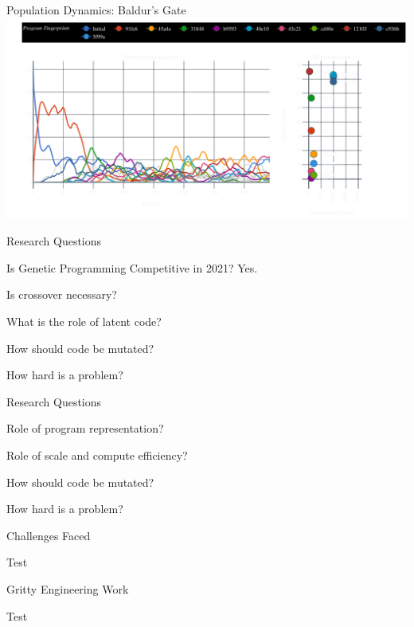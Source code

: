 \documentclass[aspectratio=169]{beamer}
\begin{document}
\begin{frame}{Population Dynamics: Baldur's Gate}
    \includegraphics[width=1.0\linewidth, keepaspectratio]{figures/baldurs_pheno_50.pdf}
\end{frame}


\begin{frame}{Research Questions}
  \begin{vfilleditems}
    \item {\Huge Is Genetic Programming Competitive in 2021? {\color{pureminimalistic@text@red} Yes.}}
    {\color{grey}
    \item {\Huge Is crossover necessary?}
    \item {\Huge What is the role of latent code?}
    \item {\Huge How should code be mutated?}
    \item {\Huge How hard is a problem?}
    }
  \end{vfilleditems}
\end{frame}

\begin{frame}{Research Questions}
  \begin{vfilleditems}
    \item {\Huge Role of program representation?}
    \item {\Huge Role of scale and compute efficiency?}
    \item {\Huge How should code be mutated?}
    \item {\Huge How hard is a problem?}
  \end{vfilleditems}
\end{frame}

\begin{frame}{Challenges Faced}
    \begin{vfilleditems}
    \item \Huge Test
    \end{vfilleditems}
\end{frame}

\begin{frame}{Gritty Engineering Work}
    \begin{vfilleditems}
    \item \Huge Test
    \end{vfilleditems}
\end{frame}
\end{document}
